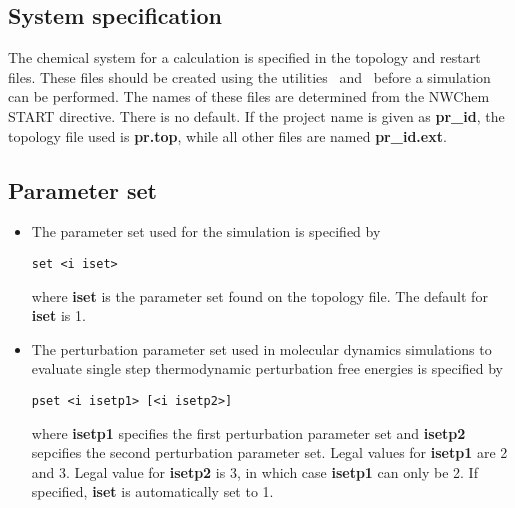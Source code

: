 \subsection{System specification}
The chemical system for a calculation is specified in the topology
and restart files. These files should be created using the utilities
\nwtop\ and \nwrst\ before a simulation can be performed.
The names of these files are determined from the NWChem START directive.
There is no default. If the project name is given as {\bf pr\_id},
the topology file used is {\bf pr.top}, while all other files
are named {\bf pr\_id.ext}.
\subsection{Parameter set}
\begin{itemize}
\item
The parameter set used for the simulation is specified by
\begin{verbatim}
set <i iset>
\end{verbatim}
where {\bf iset} is the parameter set found on the
topology file. The default for {\bf iset} is 1.
\item
The perturbation parameter set used in molecular dynamics simulations
to evaluate single step thermodynamic perturbation free energies is 
specified by
\begin{verbatim}
pset <i isetp1> [<i isetp2>]
\end{verbatim}
where {\bf isetp1} specifies the first perturbation parameter set and
{\bf isetp2} sepcifies the second perturbation parameter set. Legal
values for {\bf isetp1} are 2 and 3. Legal value for {\bf isetp2} is
3, in which case {\bf isetp1} can only be 2. If specified, {\bf iset}
is automatically set to 1.
\end{itemize}
